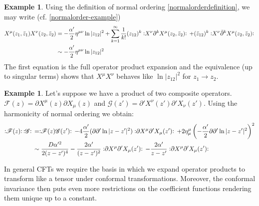 \documentclass{report}
\theoremstyle{plain}
\theoremstyle{definition}
\newtheorem{example}[theorem]{Example}
\theoremstyle{remark}
\newcommand{\FR}[2]{\frac{#1}{#2}}
\newcommand{\ms}{\mathscr}
\newcommand{\di}{\partial}
\newcommand{\NO}[1]{\vcentcolon\mathrel{#1}\vcentcolon\,}
\begin{document}
\begin{example} Using the definition of normal ordering
\eqref{normalorderdefinition}, we may write (cf.
\eqref{normalorder-example})
\begin{align*}
    X^\mu(z_1,\bar z_1)X^\nu(z_2,\bar z_2) &=
    -\FR{\alpha'}{2}\eta^{\mu\nu}\ln|z_{12}|^2 +\sum_{k=1}^\infty \FR{1}{k!} 
    (z_{12})^k \NO{X^\nu\di^k X^\mu(z_2,\bar z_2)}
    +(\bar z_{12})^k \NO{X^\nu\bar\di^k X^\mu(z_2,\bar z_2)}\\
    &\sim -\FR{\alpha'}{2}\eta^{\mu\nu}\ln|z_{12}|^2 
\end{align*}
The first equation is the full operator product expansion and the
equivalence (up to singular terms) shows that $X^\mu X^\nu$ behaves like
$\ln|z_{12}|^2$ for $z_1\to z_2$.
\end{example}
\begin{example} Let's suppose we have a product of two composite operators.
$\ms F(z) = \di X^\mu(z)\di X_\mu(z)$ and $\ms G(z') = \di'
X^\nu(z')\di'X_\nu(z')$.  Using the harmonicity of normal ordering we
obtain:
\begin{align*}
\NO{\ms F(z)}\NO{\ms G} &= \NO{\ms F(z)\ms G(z')} - 4 \FR{\alpha'}{2}
(\di\di' \ln|z-z'|^2) \NO{\di X^\mu \di' X_\mu(z')}
+2\eta^\mu_\mu \left( -\FR{\alpha'}{2}\di\di'\ln|z-z'|^2 \right)^2\\
&\sim \FR{D\alpha'^2}{2(z-z')^4}-\FR{2\alpha'}{(z-z')^2}\NO{\di X^\mu \di'
X_\mu(z')} - \FR{2\alpha'}{z-z'} \NO{\di X^\mu \di' X_\mu(z')}
\end{align*}
\end{example}

In general CFTs we require the basis in which we expand operator products
to transform like a tensor under conformal transformations. Moreover, the
conformal invariance then puts even more restrictions on the coefficient
functions rendering them unique up to a constant.  
\end{document}
